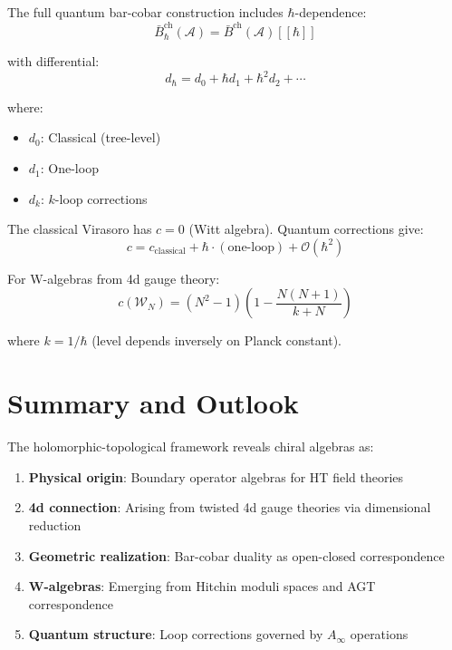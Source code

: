 \begin{theorem}
The full quantum bar-cobar construction includes $\hbar$-dependence:
$$\bar{B}^{\text{ch}}_\hbar(\mathcal{A}) = \bar{B}^{\text{ch}}(\mathcal{A})[[\hbar]]$$

with differential:
$$d_\hbar = d_0 + \hbar d_1 + \hbar^2 d_2 + \cdots$$

where:
\begin{itemize}
\item $d_0$: Classical (tree-level)
\item $d_1$: One-loop
\item $d_k$: $k$-loop corrections
\end{itemize}
\end{theorem}

\begin{example}
The classical Virasoro has $c = 0$ (Witt algebra). Quantum corrections give:
$$c = c_{\text{classical}} + \hbar \cdot (\text{one-loop}) + \mathcal{O}(\hbar^2)$$

For W-algebras from 4d gauge theory:
$$c(\mathcal{W}_N) = (N^2 - 1)\left(1 - \frac{N(N+1)}{k + N}\right)$$

where $k = 1/\hbar$ (level depends inversely on Planck constant).
\end{example}

\section{Summary and Outlook}

\begin{remark}[Summary]
The holomorphic-topological framework reveals chiral algebras as:
\begin{enumerate}
\item \textbf{Physical origin}: Boundary operator algebras for HT field theories
\item \textbf{4d connection}: Arising from twisted 4d gauge theories via 
dimensional reduction
\item \textbf{Geometric realization}: Bar-cobar duality as open-closed correspondence
\item \textbf{W-algebras}: Emerging from Hitchin moduli spaces and AGT correspondence
\item \textbf{Quantum structure}: Loop corrections governed by $A_\infty$ operations
\end{enumerate}
\end{remark}

